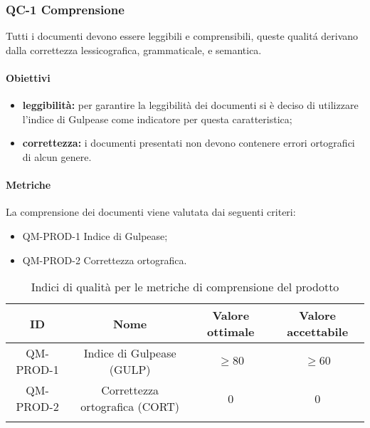 \subsubsection{QC-1 Comprensione}
Tutti i documenti devono essere leggibili e comprensibili, queste qualitá derivano dalla correttezza lessicografica, grammaticale, e semantica.
	\paragraph{Obiettivi}
		\begin{itemize}
			\item \textbf{leggibilità:} per garantire la leggibilità dei documenti si è deciso di utilizzare l'indice di Gulpease come indicatore per questa caratteristica;
			\item \textbf{correttezza:} i documenti presentati non devono contenere errori ortografici di alcun genere.
		\end{itemize}
	\paragraph{Metriche}
	La comprensione dei documenti viene valutata dai seguenti criteri:
	\begin{itemize}
		\item QM-PROD-1 Indice di Gulpease;
    \item QM-PROD-2 Correttezza ortografica.
	\end{itemize}
	\begin{center}
		\begin{longtable}{|c|c|c|c|}
			\rowcolor{lighter-grayer}
			\hline
			ID & Nome & Valore ottimale & Valore accettabile \\
			\hline
			QM-PROD-1 & Indice di Gulpease (GULP) & \(\ge 80\) & \(\ge 60\) \\
 		  	\hline
			QM-PROD-2 & Correttezza ortografica (CORT) & 0 & 0 \\
			\hline
			\caption{Indici di qualità per le metriche di comprensione del prodotto}
		\end{longtable}
		
	\end{center}
